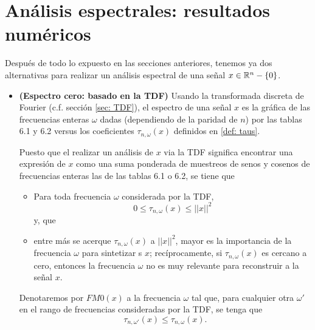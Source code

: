 \chapter{Análisis espectrales: resultados numéricos}
\label{chap: resultados numericos analisis espectrales}

Después de todo lo expuesto en las secciones anteriores, tenemos
ya dos alternativas para realizar un análisis
espectral de una señal $x \in \mathbb{R}^{n} - \{ 0 \}$.

\begin{itemize}
	\item \textbf{(Espectro cero: basado en la TDF)} 
	Usando la transformada discreta de Fourier
	(c.f. sección \ref{sec: TDF}), el espectro de
	una señal $x$ es la gráfica de las frecuencias
	enteras $\omega$ dadas (dependiendo de la 
	paridad de $n$) por las
	tablas 6.1 y 6.2
	versus los coeficientes
	$\tau_{n, \omega}(x)$ definidos en
	\ref{def: taus}.
	
	Puesto que el realizar un análisis de 
	$x$ via la TDF significa encontrar una
	expresión de $x$ como una suma
	ponderada de muestreos de senos y cosenos
	de frecuencias enteras las de las tablas 6.1 o 6.2,
	se tiene que  
	\begin{itemize}
		\item Para toda frecuencia $\omega$ considerada
		por la TDF,
		\[
		0 \leq \tau_{n, \omega}(x) \leq || x ||^{2}
		\]
		y, que
		\item entre más se acerque
		$\tau_{n, \omega}(x)$
		a $|| x ||^{2}$, mayor es la
		importancia de la frecuencia $\omega$ para
		sintetizar s $x$; recíprocamente, si 
		$\tau_{n, \omega}(x)$ es cercano a cero, entonces
		la frecuencia $\omega$ no es muy relevante para 
		reconstruir a la señal $x$.
	\end{itemize}
	\begin{defi}
	\label{def: FM0}
	Denotaremos
	por $FM0(x)$ a la frecuencia $\omega$
	tal que, para cualquier otra $\omega'$ en el rango
	de frecuencias consideradas por la TDF, se tenga que
	\[
	\tau_{n, \omega'}(x) \leq \tau_{n, \omega}(x).
	\]
	\end{defi}
	

\end{itemize}
